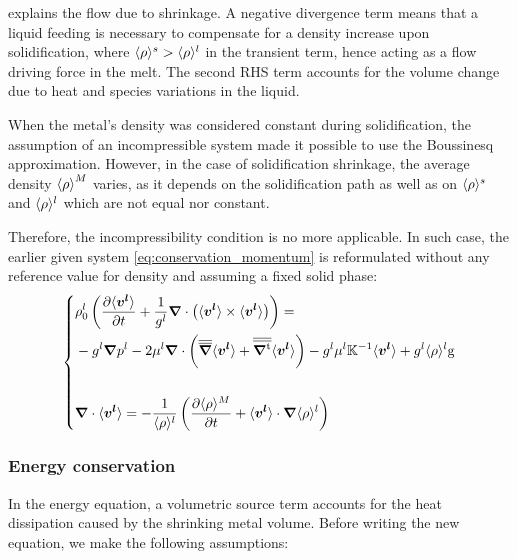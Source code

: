  explains the flow due to shrinkage. 
A negative divergence term means that a liquid feeding 
is necessary to compensate for a density increase upon solidification, where $\langle \rho \rangle^s > \langle \rho \rangle^l$ in the transient term, 
hence acting as a flow driving force in the melt.
The second RHS term accounts for the volume change 
due to heat and species variations in the liquid.

When the metal's density was considered constant during solidification, 
the assumption of an incompressible system made it possible to
use the Boussinesq approximation. However, in the case of solidification shrinkage, 
the average density ${\langle \rho \rangle}^M$ varies, as it depends on the solidification 
path as well as on $\langle \rho \rangle^s$ and $\langle \rho \rangle^l$ which are not equal nor constant.

Therefore, the incompressibility condition is no more applicable. In such case, 
the earlier given system \cref{eq:conservation_momentum} is reformulated without 
any reference value for density and assuming a fixed solid phase:
\begin{equation}
\label{eq:momentum_balance_metal}
   \left\{
   \begin{aligned}
      & \rho_{0}^{l} \left( \frac{\partial  \langle \boldsymbol{v^l} \rangle }{\partial t}  + \frac{1}{{g^l}} \boldsymbol{\nabla} \cdot \left( \langle \boldsymbol{v^l} \rangle \times \langle \boldsymbol{v^l} \rangle \right) \right) = \\
	  &- {g^l}\boldsymbol{\nabla} {p^l} - 2 \mu^l \boldsymbol{\nabla} \cdot \left( {\overline{\overline{\boldsymbol{\nabla}}}} \langle \boldsymbol{v^l} \rangle + {\overline{\overline{\boldsymbol{\nabla^\text{t}}}}} \langle \boldsymbol{v^l} \rangle \right)
	  - {g^l} \mu^l \mathbb{K}^{-1} \langle \boldsymbol{v^l} \rangle + {g^l} \langle \rho \rangle^l \boldsymbol{\text{g}}\\ \\
      & \boldsymbol{\nabla} \cdot \langle \boldsymbol{v^l} \rangle = -\frac{1}{\langle \rho \rangle^l} \left( \frac{\partial \langle \rho \rangle^M}{\partial t}  + \langle \boldsymbol{v^l} \rangle \cdot  \boldsymbol{\nabla} \langle \rho \rangle^l \right)
    \end{aligned}
    \right.
\end{equation}


\subsubsection{Energy conservation}
In the energy equation, a volumetric source term accounts for the heat dissipation 
caused by the shrinking metal volume. Before writing the new equation, we make the following assumptions:

